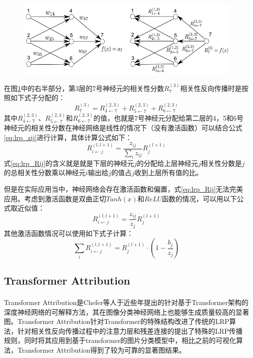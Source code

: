 \begin{figure}[h]
	\centering 
	\includegraphics[width=12cm]{fig/ch2/lrp4.png}
	\label{fig:lrp4}
\end{figure}
在图\ref{fig:lrp4}中的右半部分，第3层的7号神经元的相关性分数$R_{7}^{(3)}$相关性反向传播时是按照如下式子分配的：
\begin{equation}
	R_{7}^{(3)}=R_{4 \leftarrow 7}^{(2,3)}+R_{5 \leftarrow 7}^{(2,3)}+R_{6 \leftarrow 7}^{(2,3)}
\end{equation}
其中$R_{4 \leftarrow 7}^{(2,3)}$、$R_{5 \leftarrow 7}^{(2,3)}$和$R_{6 \leftarrow 7}^{(2,3)}$的值，也就是7号神经元分配给第二层的4，5和6号神经元的相关性分数在神经网络是线性的情况下（没有激活函数）可以结合公式\ref{eq:lrp_zij}进行计算，具体计算公式如下：
\begin{equation}
	R_{i \leftarrow j}^{(l, l+1)}=\frac{z_{i j}}{\sum_{i} z_{i j}} R_{j}^{(l+1)}
	\label{eq:lrp_Rij}
\end{equation}
式\ref{eq:lrp_Rij}的含义就是就是下层的神经元$j$的分配给上层神经元$j$相关性分数是$j$的总相关性分数乘以神经元$i$输出给$j$的值占$j$收到上层所有值的比。

但是在实际应用当中，神经网络会存在激活函数和偏置，式\ref{eq:lrp_Rij}无法完美应用。考虑到激活函数是双曲正切$Tanh(x)$和$ReLU$函数的情况，可以用以下公式取近似值：
\begin{equation}
	R_{i \leftarrow j}^{(l, l+1)}=\frac{z_{i j}}{z_{j}} R_{j}^{(l+1)}
\end{equation}
其他激活函数情况可以使用如下式子计算：
\begin{equation}
	\sum_{i} R_{i \leftarrow j}^{(l, l+1)}=R_{j}^{(l+1)} \cdot\left(1-\frac{b_{j}}{z_{j}}\right)
\end{equation}

\subsection{Transformer Attribution}
Transformer Attribution是Chefer等人\textsuperscript{\cite{chefer2021transformer}}于近些年提出的针对基于Transformer架构的深度神经网络的可解释方法，其在图像分类神经网络上也能够生成质量较高的显著图。Transformer Attribution针对Transformer的特殊结构改进了传统的LRP算法，针对相关性反向传播过程中的注意力层和残差连接的提出了特殊的LRP传播规则，同时将其应用到基于transformer的图片分类模型中，相比之前的可视化算法，Transformer Attribution得到了较为可靠的显著图结果。

